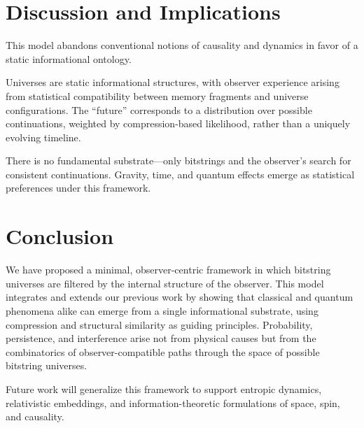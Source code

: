 \documentclass[12pt]{article}
\begin{document}
\section{Discussion and Implications}

This model abandons conventional notions of causality and dynamics in favor of a static informational ontology.

Universes are static informational structures, with observer experience arising from statistical compatibility between memory fragments and universe configurations. The “future” corresponds to a distribution over possible continuations, weighted by compression-based likelihood, rather than a uniquely evolving timeline.

There is no fundamental substrate—only bitstrings and the observer's search for consistent continuations. Gravity, time, and quantum effects emerge as statistical preferences under this framework.


\section{Conclusion}

We have proposed a minimal, observer-centric framework in which bitstring universes are filtered by the internal structure of the observer. This model integrates and extends our previous work by showing that classical and quantum phenomena alike can emerge from a single informational substrate, using compression and structural similarity as guiding principles. Probability, persistence, and interference arise not from physical causes but from the combinatorics of observer-compatible paths through the space of possible bitstring universes.

Future work will generalize this framework to support entropic dynamics, relativistic embeddings, and information-theoretic formulations of space, spin, and causality.
\end{document}
